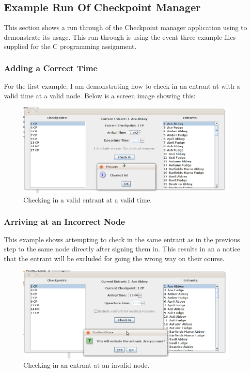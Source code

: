 \documentclass{article}
\begin{document}
\subsection{Example Run Of Checkpoint Manager}
This section shows a run through of the Checkpoint manager application using to demonstrate its usage. This run through is using the event three example files supplied for the C programming assignment.

\subsubsection{Adding a Correct Time}
For the first example, I am demonstrating how to check in an entrant at with a valid time at a valid node. Below is a screen image showing this:

\begin{figure}[H]
\centering
\includegraphics[width=1\textwidth]{img/GUI-test/valid-checkin.png}
\caption{Checking in a valid entrant at a valid time.}
\label{fig:valid-checkin}
\end{figure}

\subsubsection{Arriving at an Incorrect Node}
This example shows attempting to check in the same entrant as in the previous step to the same node directly after signing them in. This results in an a notice that the entrant will be excluded for going the wrong way on their course.

\begin{figure}[H]
\centering
\includegraphics[width=1\textwidth]{img/GUI-test/invalid-checkin.png}
\caption{Checking in an entrant at an invalid node.}
\label{fig:invalid-checkin}
\end{figure}
\end{document}
